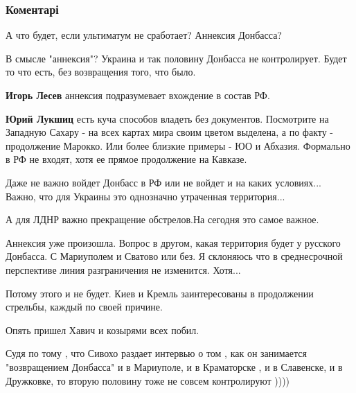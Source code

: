  
 
 
 
 
\subsubsection{Коментарі}
\label{sec:06_07_2020.fb.lesev_igor.1.kreml_ultimatum.cmt}

\begin{itemize} %
А что будет, если ультиматум не сработает? Аннексия Донбасса?

\begin{itemize} %
В смысле "аннексия"? Украина и так половину Донбасса не контролирует. Будет то что есть, без возвращения того, что было.

\textbf{Игорь Лесев} аннексия подразумевает вхождение в состав РФ.

\textbf{Юрий Лукшиц} есть куча способов владеть без документов. Посмотрите на Западную Сахару - на всех картах мира своим цветом выделена, а по факту - продолжение Марокко. Или более близкие примеры - ЮО и Абхазия. Формально в РФ не входят, хотя ее прямое продолжение на Кавказе.

Даже не важно войдет Донбасс в РФ или не войдет и на каких условиях...
Важно, что для Украины это однозначно утраченная территория...

А для ЛДНР важно прекращение обстрелов.На сегодня это самое важное.

Аннексия уже произошла.
Вопрос в другом, какая территория будет у русского Донбасса. С Мариуполем и Сватово или без.
Я склоняюсь что в среднесрочной перспективе линия разграничения не изменится. Хотя...

Потому этого и не будет. Киев и Кремль заинтересованы в продолжении стрельбы, каждый по своей причине.

Опять пришел Хавич и козырями всех побил.
\end{itemize} %


Судя по тому , что Сивохо раздает интервью о том , как он занимается
"возвращением Донбасса" и в Мариуполе, и в Краматорске , и в Славенске, и в
Дружковке, то вторую половину тоже не совсем контролируют ))))


\end{itemize}
